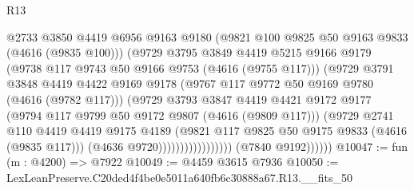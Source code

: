 \begin{lexlean}{R13}
\begin{coremodule}
                                      @2733
                                      @3850
                                      @4419
                                      @6956
                                      @9163
                                      @9180
                                      (@9821 @100 @9825 @50 @9163 @9833 (@4616 (@9835 @100)))
                                      (@9729
                                        @3795
                                        @3849
                                        @4419
                                        @5215
                                        @9166
                                        @9179
                                        (@9738 @117 @9743 @50 @9166 @9753 (@4616 (@9755 @117)))
                                        (@9729
                                          @3791
                                          @3848
                                          @4419
                                          @4422
                                          @9169
                                          @9178
                                          (@9767 @117 @9772 @50 @9169 @9780 (@4616 (@9782 @117)))
                                          (@9729
                                            @3793
                                            @3847
                                            @4419
                                            @4421
                                            @9172
                                            @9177
                                            (@9794 @117 @9799 @50 @9172 @9807 (@4616 (@9809 @117)))
                                            (@9729
                                              @2741
                                              @110
                                              @4419
                                              @4419
                                              @9175
                                              @4189
                                              (@9821
                                                @117
                                                @9825
                                                @50
                                                @9175
                                                @9833
                                                (@4616 (@9835 @117)))
                                              (@4636 @9720)))))))))))))))))
              (@7840 @9192))))))
@10047 := fun (m : @4200) => @7922
@10049 := @4459 @3615 @7936
@10050 := LexLeanPreserve.C20ded4f4be0e5011a640fb6c30888a67.R13.__fits_50

\end{coremodule}
\end{lexlean}
